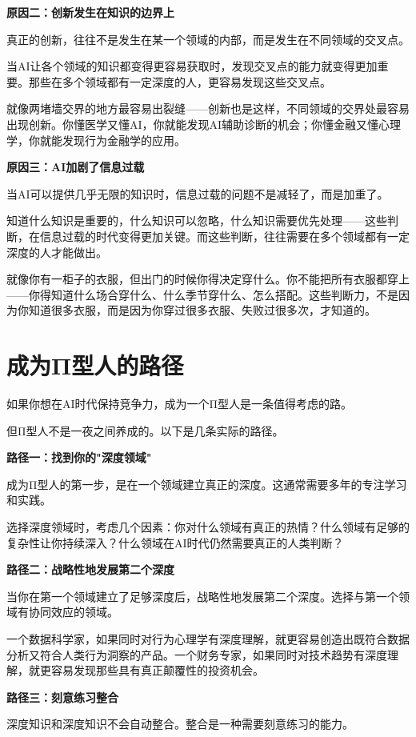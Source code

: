 \textbf{原因二：创新发生在知识的边界上}

真正的创新，往往不是发生在某一个领域的内部，而是发生在不同领域的交叉点。

当AI让各个领域的知识都变得更容易获取时，发现交叉点的能力就变得更加重要。那些在多个领域都有一定深度的人，更容易发现这些交叉点。

就像两堵墙交界的地方最容易出裂缝——创新也是这样，不同领域的交界处最容易出现创新。你懂医学又懂AI，你就能发现AI辅助诊断的机会；你懂金融又懂心理学，你就能发现行为金融学的应用。

\textbf{原因三：AI加剧了信息过载}

当AI可以提供几乎无限的知识时，信息过载的问题不是减轻了，而是加重了。

知道什么知识是重要的，什么知识可以忽略，什么知识需要优先处理——这些判断，在信息过载的时代变得更加关键。而这些判断，往往需要在多个领域都有一定深度的人才能做出。

就像你有一柜子的衣服，但出门的时候你得决定穿什么。你不能把所有衣服都穿上——你得知道什么场合穿什么、什么季节穿什么、怎么搭配。这些判断力，不是因为你知道很多衣服，而是因为你穿过很多衣服、失败过很多次，才知道的。

\section{成为Π型人的路径}


如果你想在AI时代保持竞争力，成为一个Π型人是一条值得考虑的路。

但Π型人不是一夜之间养成的。以下是几条实际的路径。

\textbf{路径一：找到你的"深度领域"}

成为Π型人的第一步，是在一个领域建立真正的深度。这通常需要多年的专注学习和实践。

选择深度领域时，考虑几个因素：你对什么领域有真正的热情？什么领域有足够的复杂性让你持续深入？什么领域在AI时代仍然需要真正的人类判断？

\textbf{路径二：战略性地发展第二个深度}

当你在第一个领域建立了足够深度后，战略性地发展第二个深度。选择与第一个领域有协同效应的领域。

一个数据科学家，如果同时对行为心理学有深度理解，就更容易创造出既符合数据分析又符合人类行为洞察的产品。一个财务专家，如果同时对技术趋势有深度理解，就更容易发现那些具有真正颠覆性的投资机会。

\textbf{路径三：刻意练习整合}

深度知识和深度知识不会自动整合。整合是一种需要刻意练习的能力。

